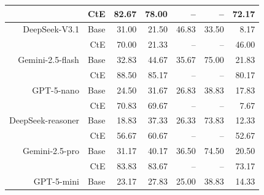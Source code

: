 \begin{table}[!t]
\begin{tabular}{r r !{\color{white!80!black} \vline} r r r r r}
& CtE & \textcolor{blue!60!black}{82.67} & \textcolor{blue!60!black}{78.00} & \textcolor{blue!60!black}{--} & \textcolor{blue!60!black}{--} & \textcolor{blue!60!black}{72.17} \\ \midrule
\sf DeepSeek-V3.1  & Base & \textcolor{blue!60!black}{31.00} & \textcolor{blue!60!black}{21.50} & \textcolor{blue!60!black}{46.83} & \textcolor{blue!60!black}{33.50} & \textcolor{blue!60!black}{8.17} \\
& CtE & \textcolor{blue!60!black}{70.00} & \textcolor{blue!60!black}{21.33} & \textcolor{blue!60!black}{--} & \textcolor{blue!60!black}{--} & \textcolor{blue!60!black}{46.00} \\ \midrule
\sf Gemini-2.5-flash  & Base & \textcolor{blue!60!black}{32.83} & \textcolor{blue!60!black}{44.67} & \textcolor{blue!60!black}{35.67} & \textcolor{blue!60!black}{75.00} & \textcolor{blue!60!black}{21.83} \\
& CtE & \textcolor{blue!60!black}{88.50} & \textcolor{blue!60!black}{85.17} & \textcolor{blue!60!black}{--} & \textcolor{blue!60!black}{--} & \textcolor{blue!60!black}{80.17} \\ \midrule
\sf GPT-5-nano  & Base & \textcolor{blue!60!black}{24.50} & \textcolor{blue!60!black}{31.67} & \textcolor{blue!60!black}{26.83} & \textcolor{blue!60!black}{38.83} & \textcolor{blue!60!black}{17.83} \\
& CtE & \textcolor{blue!60!black}{70.83} & \textcolor{blue!60!black}{69.67} & \textcolor{blue!60!black}{--} & \textcolor{blue!60!black}{--} & \textcolor{blue!60!black}{7.67} \\ \midrule
\sf DeepSeek-reasoner  & Base & \textcolor{blue!60!black}{18.83} & \textcolor{blue!60!black}{37.33} & \textcolor{blue!60!black}{26.33} & \textcolor{blue!60!black}{73.83} & \textcolor{blue!60!black}{12.33} \\
& CtE & \textcolor{blue!60!black}{56.67} & \textcolor{blue!60!black}{60.67} & \textcolor{blue!60!black}{--} & \textcolor{blue!60!black}{--} & \textcolor{blue!60!black}{52.67} \\ \midrule
\sf Gemini-2.5-pro  & Base & \textcolor{blue!60!black}{31.17} & \textcolor{blue!60!black}{40.17} & \textcolor{blue!60!black}{36.50} & \textcolor{blue!60!black}{74.50} & \textcolor{blue!60!black}{20.50} \\
& CtE & \textcolor{blue!60!black}{83.83} & \textcolor{blue!60!black}{83.67} & \textcolor{blue!60!black}{--} & \textcolor{blue!60!black}{--} & \textcolor{blue!60!black}{73.17} \\ \midrule
\sf GPT-5-mini  & Base & \textcolor{blue!60!black}{23.17} & \textcolor{blue!60!black}{27.83} & \textcolor{blue!60!black}{25.00} & \textcolor{blue!60!black}{38.83} & \textcolor{blue!60!black}{14.33} \\

\end{tabular}
\end{table}
